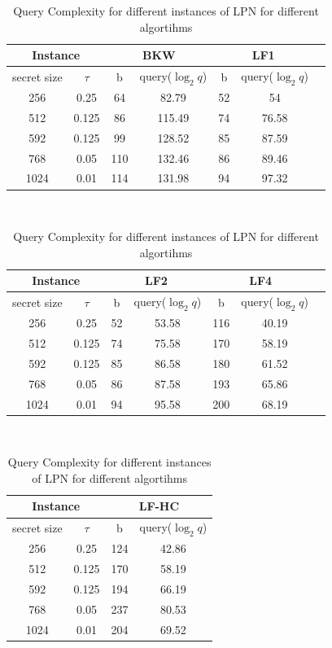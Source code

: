 \documentclass{article}
\begin{document}
 
 	\begin{table}
 		\begin{center}
 	\begin{tabular}{|c|c|c|c|c|c|c|}
 		\hline
 		\multicolumn{2}{|c|}{Instance}
 	&	\multicolumn{2}{|c|}{BKW}
 	&	\multicolumn{2}{|c|}{LF1}\\
 	    \hline
 		secret size & $\tau$ & b & query($\log_2q$) & b & query($\log_2q$)\\
 		\hline
 		256 & 0.25 & 64 & 82.79 & 52 & 54\\
 		512 & 0.125 & 86 & 115.49 & 74 & 76.58\\
 		592 & 0.125 & 99 & 128.52 & 85 & 87.59\\
 		768 & 0.05 & 110 & 132.46 & 86 & 89.46\\
 		1024 & 0.01 & 114 & 131.98 & 94 & 97.32\\
 		\hline
 	\end{tabular}
 \\
 	\begin{tabular}{|c|c|c|c|c|c|c|}
 	\hline
 	\multicolumn{2}{|c|}{Instance}
 	&	\multicolumn{2}{|c|}{LF2}
 	&	\multicolumn{2}{|c|}{LF4}\\
 	\hline
 	secret size & $\tau$ & b & query($\log_2q$) & b & query($\log_2q$)\\
 	\hline
 	256 & 0.25 & 52 & 53.58 & 116 & 40.19\\
 	512 & 0.125 & 74 & 75.58 & 170 & 58.19\\
 	592 & 0.125 & 85 & 86.58 & 180 & 61.52\\
 	768 & 0.05 & 86 & 87.58 & 193 & 65.86\\
 	1024 & 0.01 & 94 & 95.58 & 200 & 68.19\\
 	\hline
 \end{tabular}
\\
	\begin{tabular}{|c|c|c|c|}
	\hline
	\multicolumn{2}{|c|}{Instance}
	&	\multicolumn{2}{|c|}{LF-HC}\\
	\hline
	secret size & $\tau$ & b & query($\log_2q$)\\
	\hline
	256 & 0.25 & 124 & 42.86\\
	512 & 0.125 & 170 & 58.19\\
	592 & 0.125 & 194 & 66.19\\
	768 & 0.05 & 237 & 80.53\\
	1024 & 0.01 & 204 & 69.52\\
	\hline
\end{tabular}
  \caption{Query Complexity for different instances of LPN for different algortihms}
  \label{table1}
\end{center}
 \end{table}
 
\end{document}
